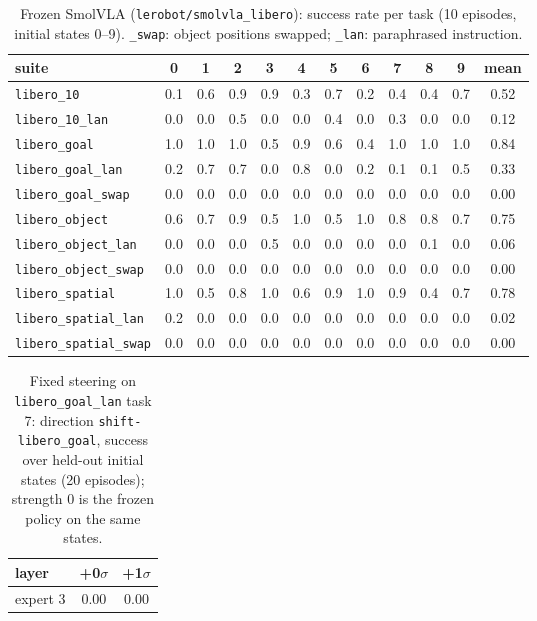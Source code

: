 \begin{table}[h]\centering\small
\setlength{\tabcolsep}{4pt}
\begin{tabular}{lccccccccccc}
\toprule
suite & 0 & 1 & 2 & 3 & 4 & 5 & 6 & 7 & 8 & 9 & mean \\
\midrule
\texttt{libero\_10} & 0.1 & 0.6 & 0.9 & 0.9 & 0.3 & 0.7 & 0.2 & 0.4 & 0.4 & 0.7 & 0.52 \\
\texttt{libero\_10\_lan} & 0.0 & 0.0 & 0.5 & 0.0 & 0.0 & 0.4 & 0.0 & 0.3 & 0.0 & 0.0 & 0.12 \\
\texttt{libero\_goal} & 1.0 & 1.0 & 1.0 & 0.5 & 0.9 & 0.6 & 0.4 & 1.0 & 1.0 & 1.0 & 0.84 \\
\texttt{libero\_goal\_lan} & 0.2 & 0.7 & 0.7 & 0.0 & 0.8 & 0.0 & 0.2 & 0.1 & 0.1 & 0.5 & 0.33 \\
\texttt{libero\_goal\_swap} & 0.0 & 0.0 & 0.0 & 0.0 & 0.0 & 0.0 & 0.0 & 0.0 & 0.0 & 0.0 & 0.00 \\
\texttt{libero\_object} & 0.6 & 0.7 & 0.9 & 0.5 & 1.0 & 0.5 & 1.0 & 0.8 & 0.8 & 0.7 & 0.75 \\
\texttt{libero\_object\_lan} & 0.0 & 0.0 & 0.0 & 0.5 & 0.0 & 0.0 & 0.0 & 0.0 & 0.1 & 0.0 & 0.06 \\
\texttt{libero\_object\_swap} & 0.0 & 0.0 & 0.0 & 0.0 & 0.0 & 0.0 & 0.0 & 0.0 & 0.0 & 0.0 & 0.00 \\
\texttt{libero\_spatial} & 1.0 & 0.5 & 0.8 & 1.0 & 0.6 & 0.9 & 1.0 & 0.9 & 0.4 & 0.7 & 0.78 \\
\texttt{libero\_spatial\_lan} & 0.2 & 0.0 & 0.0 & 0.0 & 0.0 & 0.0 & 0.0 & 0.0 & 0.0 & 0.0 & 0.02 \\
\texttt{libero\_spatial\_swap} & 0.0 & 0.0 & 0.0 & 0.0 & 0.0 & 0.0 & 0.0 & 0.0 & 0.0 & 0.0 & 0.00 \\
\bottomrule
\end{tabular}
\caption{Frozen SmolVLA (\texttt{lerobot/smolvla\_libero}): success rate per task (10 episodes, initial states 0--9). \texttt{\_swap}: object positions swapped; \texttt{\_lan}: paraphrased instruction.}
\end{table}

\begin{table}[h]\centering\small
\begin{tabular}{lcc}
\toprule
layer & +0$\sigma$ & +1$\sigma$ \\
\midrule
expert 3 & 0.00 & 0.00 \\
\bottomrule
\end{tabular}
\caption{Fixed steering on \texttt{libero\_goal\_lan} task 7: direction \texttt{shift-libero\_goal}, success over held-out initial states (20 episodes); strength 0 is the frozen policy on the same states.}
\end{table}

